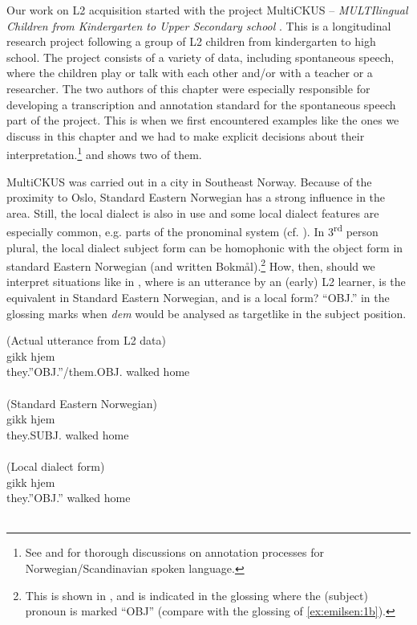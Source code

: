 \documentclass[output=paper,colorlinks,citecolor=brown,modfonts,nonflat]{../langscibook}
\begin{document}
Our work on L2 acquisition started with the project MultiCKUS – \textit{MULTIlingual Children from Kindergarten to Upper Secondary school} \citep{Arntzen2012}. This is a longitudinal research project following a group of  L2 children from kindergarten to high school. The project consists of a variety of data, including spontaneous speech, where the children play or talk with each other and/or with a teacher or a researcher. The two authors of this chapter were especially responsible for developing a transcription and annotation standard for the spontaneous speech part of the project. This is when we first encountered examples like the ones we discuss in this chapter and we had to make explicit decisions about their interpretation.\footnote{{See \citet{Johannessen2017} and \citet{Søfteland2018} for thorough discussions on annotation processes for Norwegian/Scandinavian spoken language.}}  and  shows two of them.

MultiCKUS was carried out in a city in Southeast Norway. Because of the proximity to Oslo, Standard Eastern Norwegian has a strong influence in the area. Still, the local dialect is also in use and some local dialect features are especially common, e.g. parts of the pronominal system (cf. \citealt{StjernholmSøfteland2019}). In 3\textsuperscript{rd} person plural, the local dialect subject form can be homophonic with the object form in standard Eastern Norwegian (and written Bokmål).\footnote{{This is shown in , and is indicated in the glossing where the (subject) pronoun is marked “OBJ” (compare with the glossing of \ref{ex:emilsen:1b}).}} How, then, should we interpret situations like in , where  is an utterance by an (early) L2 learner,  is the equivalent in Standard Eastern Norwegian, and  is a local form? “OBJ.” in the glossing marks when \textit{dem} would be analysed as targetlike in the subject position.

\ea\label{ex:emilsen:1}
\ea\label{ex:emilsen:1a}
(Actual utterance from L2 data)\\
  {gikk}  {hjem}\\
 they.”OBJ.”/them.OBJ. walked home \\
  \\
\ex\label{ex:emilsen:1b}
(Standard Eastern Norwegian)\\
  {gikk}  {hjem}\\
 they.SUBJ. walked home \\
 \\
\ex\label{ex:emilsen:1c}
(Local dialect form)\\
  {gikk}  {hjem}\\
 they.”OBJ.” walked home \\
  \\
\z
\z
\end{document}
